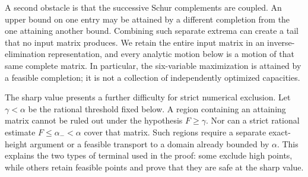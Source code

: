 \documentclass[11pt,reqno]{amsart}
\theoremstyle{definition}
\theoremstyle{remark}
\begin{document}
A second obstacle is that the successive Schur complements are coupled.
An upper bound on one entry may be attained by a different completion
from the one attaining another bound. Combining such separate extrema
can create a tail that no input matrix produces. We retain the entire
input matrix in an inverse-elimination representation, and every analytic
motion below is a motion of that same complete matrix. In particular,
the six-variable maximization is attained by a feasible completion;
it is not a collection of independently optimized capacities.

The sharp value presents a further difficulty for strict numerical
exclusion. Let \(\gamma<\alpha\) be the rational threshold fixed below.
A region containing an attaining matrix cannot be ruled out under the
hypothesis \(F\ge\gamma\). Nor can a strict rational estimate
\(F\le\alpha_-<\alpha\) cover that matrix. Such regions require a
separate exact-height argument or a feasible transport to a domain
already bounded by \(\alpha\). This explains the two types of terminal
used in the proof: some exclude high points, while others retain feasible
points and prove that they are safe at the sharp value.
\end{document}
